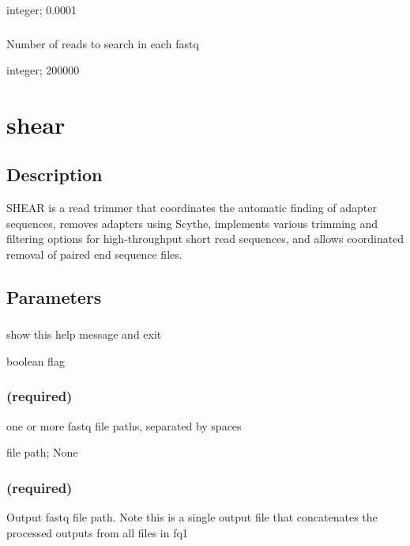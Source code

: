 \documentclass[letterpaper,10pt,english]{sphinxmanual}
\begin{document}
 integer;  0.0001


\subsubsection{}
\label{\detokenize{prog_desc:n-number-of-reads}}
 Number of reads to search in each fastq

 integer;  200000


\section{shear}
\label{\detokenize{prog_desc:shear}}

\subsection{Description}
\label{\detokenize{prog_desc:id1}}
SHEAR is a read trimmer that coordinates the automatic
finding of adapter sequences, removes adapters using Scythe,
implements various trimming and filtering options
for high-throughput short read sequences, and allows coordinated
removal of paired end sequence files.


\subsection{Parameters}
\label{\detokenize{prog_desc:id2}}

\subsubsection{}
\label{\detokenize{prog_desc:id3}}
 show this help message and exit

 boolean flag


\subsubsection{ (required)}
\label{\detokenize{prog_desc:id4}}
 one or more fastq file paths, separated by spaces

 file path;  None


\subsubsection{ (required)}
\label{\detokenize{prog_desc:out1-required}}
 Output fastq file path. Note this is a single output file that concatenates the processed outputs from all files in \textendash{}fq1
\end{document}
